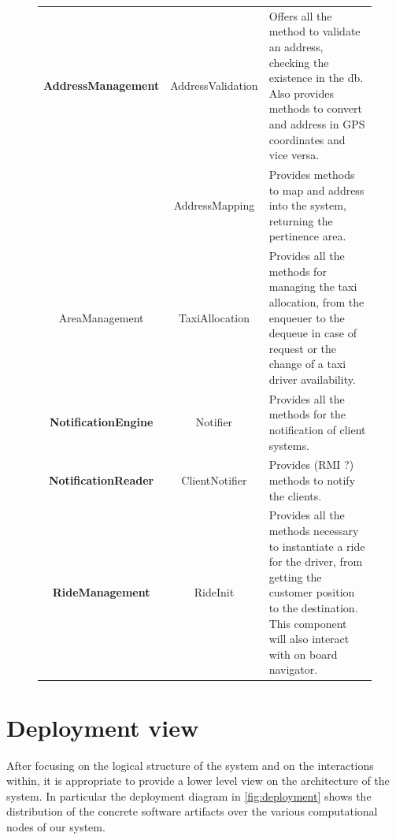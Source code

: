 \clearpage

\begin{figure}\begin{tabularx}{\textwidth}{ >{\bfseries}c C{\iW} X }\toprule




	AddressManagement
	& 
	AddressValidation 
	& 
	Offers all the method to validate an address, checking the existence in the db. Also provides methods to convert and address in GPS coordinates and vice versa.	
	\\ 
	&
	AddressMapping
	&
	Provides methods to map and address into the system, returning the pertinence area.
	\\

\midrule

	AreaManagement 
	& 
	TaxiAllocation 
	& 
	Provides all the methods for managing the taxi allocation, from the enqueuer to the dequeue in case of request or the change of a taxi driver availability.
	\\ 

\midrule
	NotificationEngine 
	& 
	Notifier 
	& 
	Provides all the methods for the notification of client systems.
	\\ 

\midrule
	NotificationReader 
	& 
	ClientNotifier 
	& 
	Provides (RMI ?) methods to notify the clients.
	\\ 

\midrule
	RideManagement 
	& 
	RideInit 
	& 
	Provides all the methods necessary to instantiate a ride for the driver, from getting the customer position to the destination. This component will also interact with on board navigator.
	\\ 

\bottomrule\end{tabularx}\end{figure}

\nobreakspace \newline






















\clearpage%
\section{Deployment view}\label{sec:deployment}
After focusing on the logical structure of the system and on the interactions within, it is appropriate to provide a lower level view on the architecture of the system. In particular the deployment diagram in \cref{fig:deployment} shows the distribution of the concrete software artifacts over the various computational nodes of our system.


